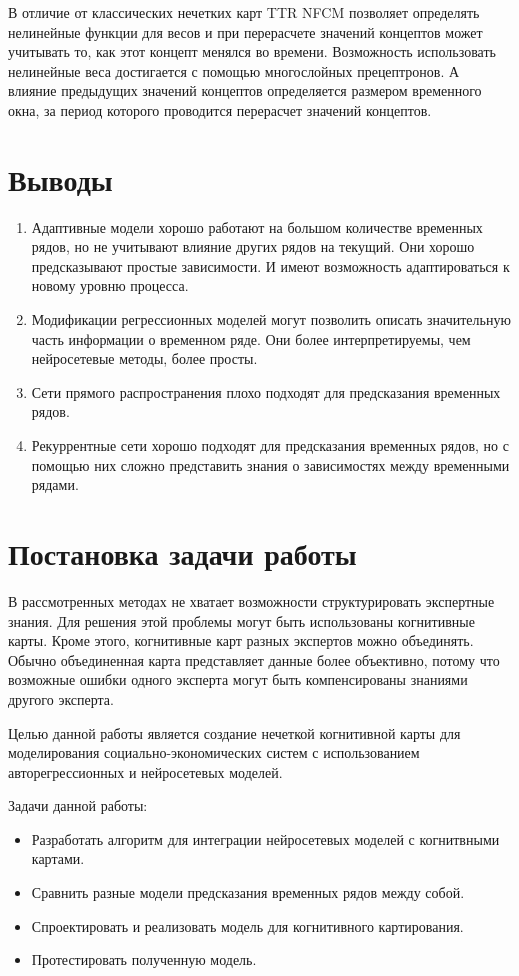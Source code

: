 В отличие от классических нечетких карт TTR NFCM позволяет
определять нелинейные функции для весов и при перерасчете значений концептов может учитывать то, как
этот концепт менялся во времени. Возможность использовать нелинейные веса достигается с помощью многослойных прецептронов.
А влияние предыдущих значений концептов определяется размером временного окна, за период которого проводится перерасчет
значений концептов.


\section{Выводы}

\begin{enumerate}
	\item Адаптивные модели хорошо работают на большом количестве временных рядов,
	но не учитывают влияние других рядов на текущий. Они хорошо предсказывают простые зависимости.
	И имеют возможность адаптироваться к новому уровню процесса.
	\item Модификации регрессионных моделей могут позволить описать значительную
	часть информации о временном ряде. Они более интерпретируемы, чем нейросетевые методы, более просты.
	\item Сети прямого распространения плохо подходят для предсказания временных рядов.
	\item Рекуррентные сети хорошо подходят для предсказания временных рядов, но
	с помощью них сложно представить знания о зависимостях между временными рядами.
\end{enumerate}


\section{Постановка задачи работы}


В рассмотренных методах не хватает возможности структурировать экспертные знания.
Для решения этой проблемы могут быть использованы когнитивные карты.
Кроме этого, когнитивные карт разных экспертов можно объединять. Обычно
объединенная карта представляет данные более объективно, потому что возможные
ошибки одного эксперта могут быть компенсированы знаниями другого эксперта.

Целью данной работы является создание нечеткой когнитивной карты для моделирования
социально-экономических систем с использованием авторегрессионных и нейросетевых моделей.

Задачи данной работы:
\begin{itemize}
	\item Разработать алгоритм для интеграции нейросетевых моделей с когнитвными картами.
	\item Сравнить разные модели предсказания временных рядов между собой.
	\item Спроектировать и реализовать модель для когнитивного картирования.
	\item Протестировать полученную модель.
\end{itemize}


